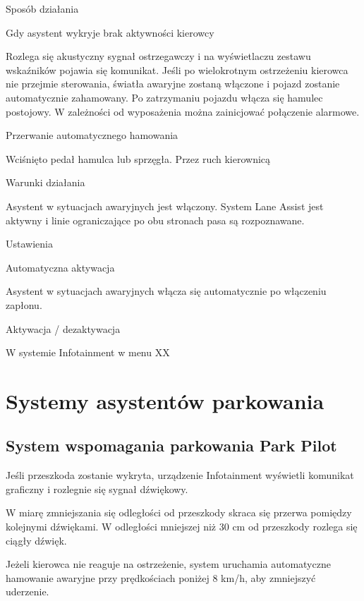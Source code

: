 Sposób działania

Gdy asystent wykryje brak aktywności kierowcy
\begin{itemizeTriangle}
	\itemTriangle Rozlega się akustyczny sygnał ostrzegawczy i na wyświetlaczu zestawu wskaźników pojawia się komunikat.
	\itemTriangle Jeśli po wielokrotnym ostrzeżeniu kierowca nie przejmie sterowania, światła awaryjne zostaną włączone i pojazd zostanie automatycznie zahamowany.
	\itemTriangle Po zatrzymaniu pojazdu włącza się hamulec postojowy. W zależności od wyposażenia można zainicjować połączenie alarmowe.
\end{itemizeTriangle}

Przerwanie automatycznego hamowania
\begin{itemizeTriangle}
	\itemTriangle Wciśnięto pedał hamulca lub sprzęgła.
	\itemTriangle Przez ruch kierownicą
\end{itemizeTriangle}

Warunki działania
\begin{itemizeTick}
	\itemTick Asystent w sytuacjach awaryjnych jest włączony.
	\itemTick System Lane Assist jest aktywny i linie ograniczające po obu stronach pasa są rozpoznawane.
\end{itemizeTick}

Ustawienia

Automatyczna aktywacja

Asystent w sytuacjach awaryjnych włącza się automatycznie po włączeniu zapłonu.

Aktywacja / dezaktywacja

W systemie Infotainment w menu XX

\section{Systemy asystentów parkowania}

\subsection{System wspomagania parkowania Park Pilot}

Jeśli przeszkoda zostanie wykryta, urządzenie Infotainment wyświetli komunikat graficzny i rozlegnie się sygnał dźwiękowy.

W miarę zmniejszania się odległości od przeszkody skraca się przerwa pomiędzy kolejnymi dźwiękami.
W odległości mniejszej niż 30 cm od przeszkody rozlega się ciągły dźwięk.

Jeżeli kierowca nie reaguje na ostrzeżenie, system uruchamia automatyczne hamowanie awaryjne przy prędkościach poniżej 8 km/h, aby zmniejszyć uderzenie.

